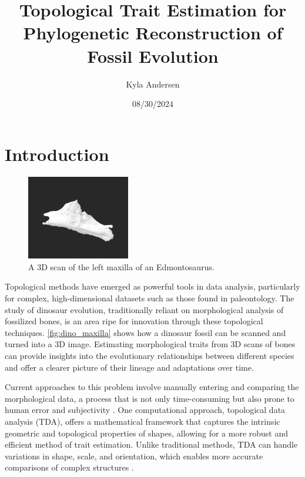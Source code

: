 \documentclass[12pt]{article}
\begin{document}
\title{Topological Trait Estimation for Phylogenetic Reconstruction of Fossil
Evolution}
\author{Kyla Andersen}
\date{08/30/2024}
\maketitle

\doublespacing

\section{Introduction}
\begin{figure}
	\centering
	\includegraphics[width=0.4\textwidth]{dino_bone.png}
	\caption{A  3D scan of the left maxilla of an Edmontosaurus.}
	\label{fig:dino_maxilla}
\end{figure}

Topological methods have emerged as powerful tools in data analysis,
particularly for complex, high-dimensional datasets such as those found in
paleontology. The study of dinosaur evolution, traditionally reliant on
morphological analysis of fossilized bones, is an area ripe for innovation
through these topological techniques. \autoref{fig:dino_maxilla} shows how a dinosaur fossil can
be scanned and turned into a 3D image. Estimating morphological traits from 3D
scans of bones can provide insights into the evolutionary relationships between
different species and offer a clearer picture of their lineage and adaptations
over time. 

Current approaches to this problem involve manually entering and comparing the 
morphological data, a process that is not only time-consuming but also prone to
human error and subjectivity \citep{bates2009}. One computational approach, topological 
data analysis (TDA), offers a mathematical framework that captures the intrinsic 
geometric and topological properties of shapes, allowing for a more robust and 
efficient method of trait estimation. Unlike traditional methods, TDA can handle 
variations in shape, scale, and orientation, which enables more accurate
comparisons of complex structures \citep{zomorodian2009}.
\end{document}
